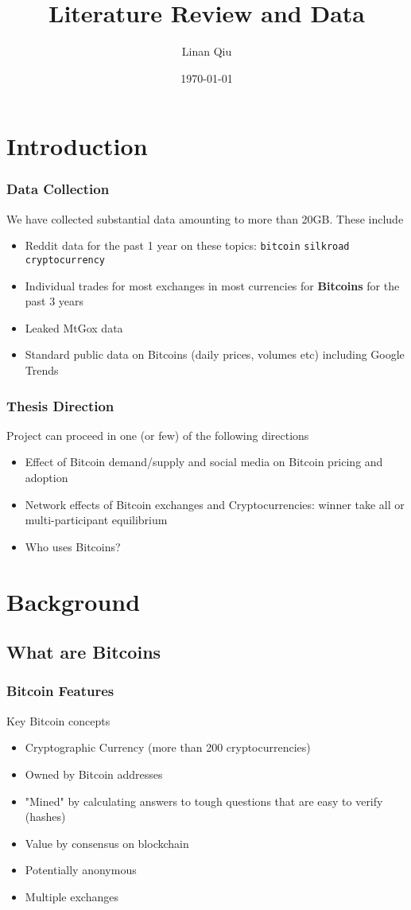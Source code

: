 \documentclass[9pt, compress]{beamer}
\begin{document}
\title{Literature Review and Data} 
\author{Linan Qiu} 
\date{\today} 

\frame{\titlepage} 


\section{Introduction}

\begin{frame}[fragile]
\frametitle{Data Collection}
We have collected substantial data amounting to more than 20GB. These include
\begin{itemize}
\item Reddit data for the past 1 year on these topics: \texttt{bitcoin} \texttt{silkroad} \texttt{cryptocurrency}
\item Individual trades for most exchanges in most currencies for \textbf{Bitcoins} for the past 3 years
\item Leaked MtGox data
\item Standard public data on Bitcoins (daily prices, volumes etc) including Google Trends
\end{itemize}
\end{frame}

\begin{frame}[fragile]
\frametitle{Thesis Direction}
Project can proceed in one (or few) of the following directions

\begin{itemize}
\item Effect of Bitcoin demand/supply and social media on Bitcoin pricing and adoption
\item Network effects of Bitcoin exchanges and Cryptocurrencies: winner take all or multi-participant equilibrium
\item Who uses Bitcoins?
\end{itemize}
\end{frame}

\section{Background}
\subsection{What are Bitcoins}
\begin{frame}[fragile]
\frametitle{Bitcoin Features}
Key Bitcoin concepts
\begin{itemize}
\item Cryptographic Currency (more than 200 cryptocurrencies)
\item Owned by Bitcoin addresses
\item "Mined" by calculating answers to tough questions that are easy to verify (hashes)
\item Value by consensus on blockchain
\item Potentially anonymous
\item Multiple exchanges
\end{itemize}
\end{frame}
\end{document}
